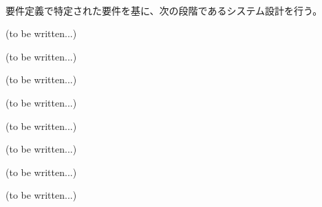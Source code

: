 {\paragraph*{\tpartnextstep}
要件定義で特定された要件を基に、次の段階であるシステム設計を行う。
}








(to be written...)



(to be written...)



(to be written...)







(to be written...)



(to be written...)



(to be written...)







(to be written...)



(to be written...)

\begin{appendices}
\end{appendices}


